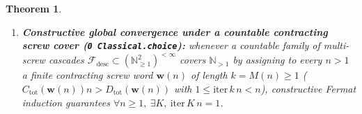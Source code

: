 \documentclass[11pt,a4paper]{article}
\newtheorem{theorem}{Theorem}[section]
\theoremstyle{definition}
\theoremstyle{remark}
\begin{document}
\begin{theorem}
\begin{enumerate}[label=\textbf{(\roman*)},leftmargin=*,noitemsep]
  \[
    \mathcal{D}_{\mathrm{core}}^{(M)} + \mathcal{E}_{\mathrm{core}}^{(M)} \;\equiv\; \bigl(U_M - 3^{B_M}\bigr) q_0, \qquad
    2^{A_M - R_0}(n_0 - n_M) \;\equiv\; \bigl(2^{A_M} - 3^{B_M}\bigr) q_0 - \mathcal{D}_{\mathrm{core}}^{(M)} \;\equiv\; \bigl(2^{A_M} - U_M\bigr) q_0 + \mathcal{E}_{\mathrm{core}}^{(M)},
  \]
  so the purely multiplicative inequality $2^{A_M} > U_M$ unconditionally forces $(2^{A_M} - 3^{B_M}) n_0 > D_{\mathrm{tot}}$ and $n_M < n_0$ for all $q_0 \ge 1$. Furthermore, for any closed cycle $n_M = n_0$ ($q_M = q_0 \ge 1,\ R_M = R_0$), $(2^{A_M} - 3^{B_M}) q_0 = \mathcal{D}_{\mathrm{core}}^{(M)} > 0$ and $(U_M - 2^{A_M}) q_0 = \mathcal{E}_{\mathrm{core}}^{(M)} \ge 0$ eliminate $q_0$ via $(U_M - 2^{A_M})\mathcal{D}_{\mathrm{core}}^{(M)} \equiv (2^{A_M} - 3^{B_M})\mathcal{E}_{\mathrm{core}}^{(M)}$ and trap the cycle exponents inside the multiplicative envelope gap $3^{B_M} < 2^{A_M} \le U_M$, with $2^{A_M} = U_M \iff \mathcal{E}_{\mathrm{core}}^{(M)} = 0$ ($q_0 = \dots = q_{M-1} = 1$, the trivial root $n_0 = 1$);
\item \textbf{Constructive global convergence under a countable contracting screw cover (\texttt{0 Classical.choice}):}
  whenever a countable family of multi-screw cascades $\mathcal{F}_{\mathrm{desc}} \subset (\mathbb{N}_{\ge 1}^2)^{<\infty}$ covers $\mathbb{N}_{>1}$ by assigning to every $n > 1$ a finite contracting screw word $\mathbf{w}(n)$ of length $k = M(n) \ge 1$ ($C_{\mathrm{tot}}(\mathbf{w}(n))n > D_{\mathrm{tot}}(\mathbf{w}(n))$ with $1 \le \mathrm{iter}\,k\,n < n$), constructive Fermat induction guarantees $\forall n \ge 1,\ \exists K,\ \mathrm{iter}\,K\,n = 1$.
\end{enumerate}
\end{theorem}
\end{document}
